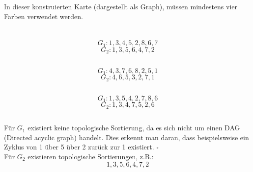 \documentclass[10pt,a4paper,oneside,ngerman,numbers=noenddot]{scrartcl}
\begin{document}
		\subsubsection{} %
			
			In dieser konstruierten Karte (dargestellt als Graph), müssen mindestens vier Farben verwendet werden.
\section{} %
	\subsection{} %
		\[
			G_{1}: 1, 3, 4, 5, 2, 8, 6, 7
		\]
		\[
			G_{2}: 1, 3, 5, 6, 4, 7, 2
		\]
	\subsection{} %
		\[
			G_{1}: 4, 3, 7, 6, 8, 2, 5, 1
		\]
		\[
			G_{2}: 4, 6, 5, 3, 2, 7, 1
		\]
	\subsection{} %
		\[
			G_{1}: 1, 3, 5, 4, 2, 7, 8, 6
		\]
		\[
			G_{2}: 1, 3, 4, 7, 5, 2, 6
		\]
	\subsection{} %
            Für $G_1$ existiert keine topologische Sortierung, da es sich nicht um einen DAG (Directed acyclic graph) handelt. Dies erkennt man daran, dass beispielsweise ein Zyklus von 1 über 5 über 2 zurück zur 1 existiert. $\square$ \\
            Für $G_2$ existieren topologische Sortierungen, z.B.:\\
            \[
                1, 3, 5, 6, 4, 7, 2
            \]
\end{document}
